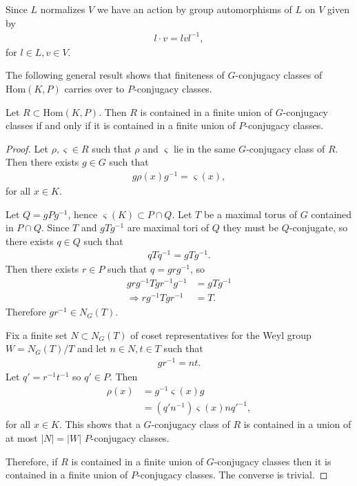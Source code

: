 Since $L$ normalizes $V$ we have an action by group automorphisms of $L$ on $V$ given by
\begin{align} \label{laction} l \cdot v = lvl^{-1}, \end{align}
for $l \in L, v \in V$.


The following general result shows that finiteness of $G$-conjugacy classes of $\mathrm{Hom}(K, P)$ carries over to $P$-conjugacy classes. 
\begin{lemma} Let $R \subset \mathrm{Hom}(K, P)$. Then $R$ is contained in a finite union of $G$-conjugacy classes if and only if it is contained in a finite union of $P$-conjugacy classes.
  \label{lem:GPconj}
\end{lemma}
\begin{proof}
	Let $\rho, \varsigma \in R$ such that $\rho$ and $\varsigma$ lie in the same $G$-conjugacy class of $R$. Then there exists $g\in G$ such that
	\begin{align*}
		g \rho(x) g^{-1} = \varsigma(x),
	\end{align*}
for all $x \in K$.
	
	Let $Q = gPg^{-1}$, hence $\varsigma(K) \subset P \cap Q$.
	Let $T$ be a maximal torus of $G$ contained in $P\cap Q$. Since $T$ and $gTg^{-1}$ are maximal tori of $Q$ they must be $Q$-conjugate, so there exists $q\in Q$ such that
	\begin{align*}
		qTq^{-1} = gTg^{-1}.
	\end{align*}
	Then there exists $r\in P$ such that $q = grg^{-1}$, so
	\begin{align*}
		grg^{-1}Tgr^{-1}g^{-1} &= gTg^{-1} \\
		\Rightarrow rg^{-1}Tgr^{-1} &= T.
	\end{align*}
	Therefore $gr^{-1} \in N_G(T)$. 

	Fix a finite set $N \subset N_G(T)$ of coset representatives for the Weyl group $W = N_G(T)/T$ and let $n \in N, t \in T$ such that
	\begin{align*}
		gr^{-1} = nt.
	\end{align*}
	Let $q' = r^{-1}t^{-1}$ so $q' \in P$. Then
	\begin{align*}
		\rho(x) &= g^{-1} \varsigma(x) g\\
		&= (q'n^{-1}) \varsigma(x) nq'^{-1},
	\end{align*}
	for all $x \in K$.
	This shows 
	that a $G$-conjugacy class of $R$ is contained in a union of at most $|N| = |W|$ $P$-conjugacy classes.

	Therefore, if $R$ is contained in a finite union of $G$-conjugacy classes then it is contained in a finite union of $P$-conjugacy classes. The converse is trivial.
\end{proof}


